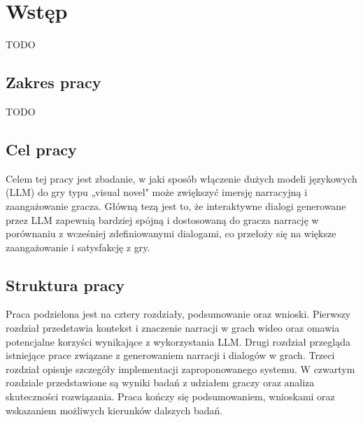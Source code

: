 
\chapter*{Wstęp}\label{chapter:introduction}

TODO

\section*{Zakres pracy}

TODO

\section*{Cel pracy}

Celem tej pracy jest zbadanie, w jaki sposób włączenie dużych modeli językowych (LLM) do gry typu „visual novel"
może zwiększyć imersję narracyjną i zaangażowanie gracza. Główną tezą jest to, że interaktywne dialogi generowane
przez LLM zapewnią bardziej spójną i dostosowaną do gracza narrację w porównaniu z wcześniej zdefiniowanymi
dialogami, co przełoży się na większe zaangażowanie i satysfakcję z gry.

\section*{Struktura pracy}

Praca podzielona jest na cztery rozdziały, podsumowanie oraz wnioski. Pierwszy rozdział przedstawia kontekst i
znaczenie narracji w grach wideo oraz omawia potencjalne korzyści wynikające z wykorzystania LLM. Drugi rozdział
przegląda istniejące prace związane z generowaniem narracji i dialogów w grach. Trzeci rozdział opisuje szczegóły
implementacji zaproponowanego systemu. W czwartym rozdziale przedstawione są wyniki badań z udziałem graczy oraz
analiza skuteczności rozwiązania. Praca kończy się podsumowaniem, wnioskami oraz wskazaniem możliwych kierunków
dalszych badań.